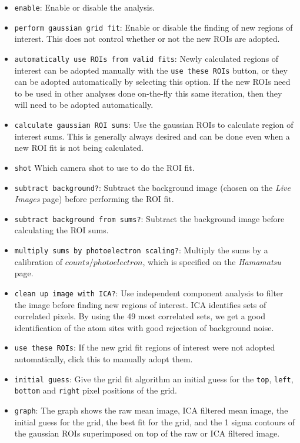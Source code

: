 \documentclass[pdftex,11pt,letterpaper]{article}
\begin{document}
\begin{itemize}
\item \texttt{enable}:  Enable or disable the analysis.
\item \texttt{perform gaussian grid fit}:  Enable or disable the finding of new regions of interest.  This does not control whether or not the new ROIs are adopted.
\item \texttt{automatically use ROIs from valid fits}:  Newly calculated regions of interest can be adopted manually with the \texttt{use these ROIs} button, or they can be adopted automatically by selecting this option.  If the new ROIs need to be used in other analyses done on-the-fly this same iteration, then they will need to be adopted automatically.
\item \texttt{calculate gaussian ROI sums}:  Use the gaussian ROIs to calculate region of interest sums.  This is generally always desired and can be done even when a new ROI fit is not being calculated.
\item \texttt{shot}  Which camera shot to use to do the ROI fit.
\item \texttt{subtract background?}:  Subtract the background image (chosen on the \textit{Live Images} page) before performing the ROI fit.
\item \texttt{subtract background from sums?}:  Subtract the background image before calculating the ROI sums.
\item \texttt{multiply sums by photoelectron scaling?}:  Multiply the sums by a calibration of $counts/photoelectron$, which is specified on the \textit{Hamamatsu} page.
\item \texttt{clean up image with ICA?}:  Use independent component analysis to filter the image before finding new regions of interest.  ICA identifies sets of correlated pixels.  By using the 49 most correlated sets, we get a good identification of the atom sites with good rejection of background noise.
\item \texttt{use these ROIs}:  If the new grid fit regions of interest were not adopted automatically, click this to manually adopt them.
\item \texttt{initial guess}:  Give the grid fit algorithm an initial guess for the \texttt{top}, \texttt{left}, \texttt{bottom} and \texttt{right} pixel positions of the grid.
\item \texttt{graph}:  The graph shows the raw mean image, ICA filtered mean image, the initial guess for the grid, the best fit for the grid, and the 1 sigma contours of the gaussian ROIs superimposed on top of the raw or ICA filtered image.
\end{itemize}
\end{document}
